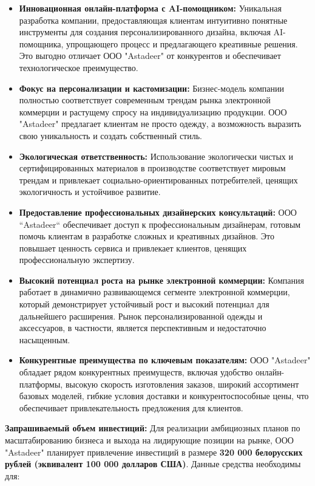 \begin{itemize}
    \item \textbf{Инновационная онлайн-платформа с AI-помощником:}  Уникальная разработка компании, предоставляющая клиентам интуитивно понятные инструменты для создания персонализированного дизайна, включая AI-помощника, упрощающего процесс и предлагающего креативные решения.  Это выгодно отличает ООО "Astadeer" от конкурентов и обеспечивает технологическое преимущество.
    \item \textbf{Фокус на персонализации и кастомизации:}  Бизнес-модель компании полностью соответствует современным трендам рынка электронной коммерции и растущему спросу на индивидуализацию продукции.  ООО "Astadeer" предлагает клиентам не просто одежду, а возможность выразить свою уникальность и создать собственный стиль.
    \item \textbf{Экологическая ответственность:}  Использование экологически чистых и сертифицированных материалов в производстве соответствует мировым трендам и привлекает социально-ориентированных потребителей, ценящих экологичность и устойчивое развитие.
    \item \textbf{Предоставление профессиональных дизайнерских консультаций:}  ООО ``Astadeer`` обеспечивает доступ к профессиональным дизайнерам, готовым помочь клиентам в разработке сложных и креативных дизайнов.  Это повышает ценность сервиса и привлекает клиентов, ценящих профессиональную экспертизу.
    \item \textbf{Высокий потенциал роста на рынке электронной коммерции:}  Компания работает в динамично развивающемся сегменте электронной коммерции, который демонстрирует устойчивый рост и высокий потенциал для дальнейшего расширения.  Рынок персонализированной одежды и аксессуаров, в частности, является перспективным и недостаточно насыщенным.
    \item \textbf{Конкурентные преимущества по ключевым показателям:}  ООО "Astadeer" обладает рядом конкурентных преимуществ, включая удобство онлайн-платформы, высокую скорость изготовления заказов, широкий ассортимент базовых моделей, гибкие условия доставки и конкурентоспособные цены, что обеспечивает привлекательность предложения для клиентов.
\end{itemize}

\vspace{0.5cm}

\textbf{Запрашиваемый объем инвестиций:}  Для реализации амбициозных планов по масштабированию бизнеса и выхода на лидирующие позиции на рынке, ООО "Astadeer" планирует привлечение инвестиций в размере \textbf{320 000 белорусских рублей (эквивалент 100 000 долларов США)}.  Данные средства необходимы для:

